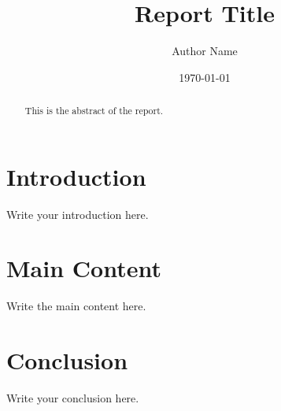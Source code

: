 \documentclass[a4paper,12pt]{article}
\title{Report Title}
\author{Author Name}
\date{\today}
\begin{document}
\maketitle

\begin{abstract}
This is the abstract of the report.
\end{abstract}

\section{Introduction}
Write your introduction here.

\section{Main Content}
Write the main content here.

\section{Conclusion}
Write your conclusion here.



\end{document}
